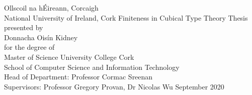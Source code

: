 \thispagestyle{empty}
{\centering

Ollscoil na hÉireann, Corcaigh \\
National University of Ireland, Cork
\vfill
Finiteness in Cubical Type Theory
\vfill
Thesis presented by \\
Donnacha Oisín Kidney \\
for the degree of \\
Master of Science
\vfill
University College Cork \\
School of Computer Science and Information Technology \\
Head of Department: Professor Cormac Sreenan \\
Supervisors: Professor Gregory Provan, Dr Nicolas Wu
\vfill
September 2020}


